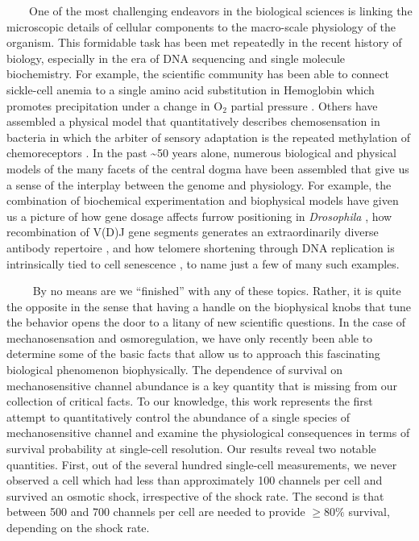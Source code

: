 \documentclass[12pt]{caltech_thesis}
\begin{document}
~~~~One of the most challenging endeavors in the biological sciences is
linking the microscopic details of cellular components to the
macro-scale physiology of the organism. This formidable task has been
met repeatedly in the recent history of biology, especially in the era
of DNA sequencing and single molecule biochemistry. For example, the
scientific community has been able to connect sickle-cell anemia to a
single amino acid substitution in Hemoglobin which promotes
precipitation under a change in O\(_2\) partial pressure
\autocite{feeling-taylor2004,finch1973,perutz1950}. Others have
assembled a physical model that quantitatively describes chemosensation
in bacteria \autocite{berg1977} in which the arbiter of sensory
adaptation is the repeated methylation of chemoreceptors
\autocite{colin2017,krembel2015a,krembel2015,sourjik2002b}. In the past
\textasciitilde50 years alone, numerous biological and physical models
of the many facets of the central dogma have been assembled that give us
a sense of the interplay between the genome and physiology. For example,
the combination of biochemical experimentation and biophysical models
have given us a picture of how gene dosage affects furrow positioning in
\emph{Drosophila} \autocite{liu2013}, how recombination of V(D)J gene
segments generates an extraordinarily diverse antibody repertoire
\autocite{lovely2015,schatz2004,schatz2011}, and how telomere shortening
through DNA replication is intrinsically tied to cell senescence
\autocite{herbig2004,victorelli2017}, to name just a few of many such
examples.

~~~~ By no means are we ``finished'' with any of these topics. Rather,
it is quite the opposite in the sense that having a handle on the
biophysical knobs that tune the behavior opens the door to a litany of
new scientific questions. In the case of mechanosensation and
osmoregulation, we have only recently been able to determine some of the
basic facts that allow us to approach this fascinating biological
phenomenon biophysically. The dependence of survival on mechanosensitive
channel abundance is a key quantity that is missing from our collection
of critical facts. To our knowledge, this work represents the first
attempt to quantitatively control the abundance of a single species of
mechanosensitive channel and examine the physiological consequences in
terms of survival probability at single-cell resolution. Our results
reveal two notable quantities. First, out of the several hundred
single-cell measurements, we never observed a cell which had less than
approximately 100 channels per cell and survived an osmotic shock,
irrespective of the shock rate. The second is that between 500 and 700
channels per cell are needed to provide \(\geq 80\%\) survival,
depending on the shock rate.
\end{document}
